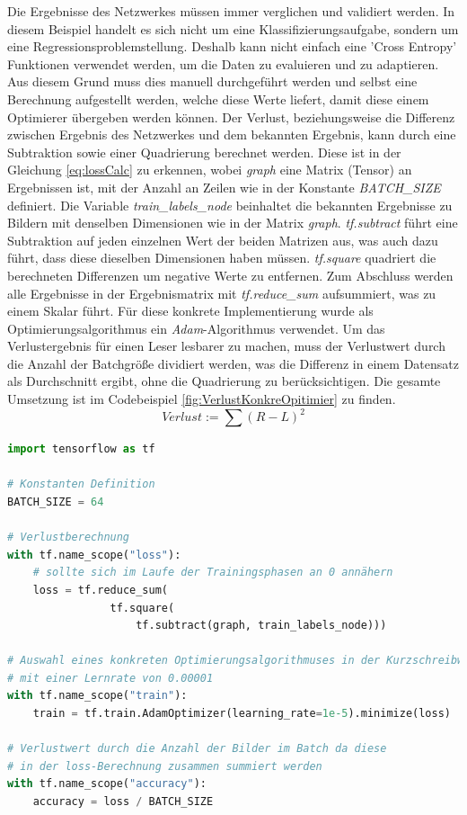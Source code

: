 Die Ergebnisse des Netzwerkes müssen immer verglichen und validiert werden. 
In diesem Beispiel handelt es sich nicht um eine Klassifizierungsaufgabe, sondern um eine Regressionsproblemstellung. 
Deshalb kann nicht einfach eine 'Cross Entropy' Funktionen verwendet werden, um die Daten zu evaluieren und zu adaptieren. 
Aus diesem Grund muss dies manuell durchgeführt werden und selbst eine Berechnung aufgestellt werden, welche diese Werte liefert, damit diese einem Optimierer übergeben werden können. 
Der Verlust, beziehungsweise die Differenz zwischen Ergebnis des Netzwerkes und dem bekannten Ergebnis, kann durch eine Subtraktion sowie einer Quadrierung berechnet werden. 
Diese ist in der Gleichung \ref{eq:lossCalc} zu erkennen, wobei \textit{graph} eine Matrix (Tensor) an Ergebnissen ist, mit der Anzahl an Zeilen wie in der Konstante \textit{BATCH\_SIZE} definiert. 
Die Variable \textit{train\_labels\_node} beinhaltet die bekannten Ergebnisse zu Bildern mit denselben Dimensionen wie in der Matrix \textit{graph}. 
\textit{tf.subtract} führt eine Subtraktion auf jeden einzelnen Wert der beiden Matrizen aus, was auch dazu führt, dass diese dieselben Dimensionen haben müssen. 
\textit{tf.square} quadriert die berechneten Differenzen um negative Werte zu entfernen. 
Zum Abschluss werden alle Ergebnisse in der Ergebnismatrix mit \textit{tf.reduce\_sum} aufsummiert, was zu einem Skalar führt. 
Für diese konkrete Implementierung wurde als Optimierungsalgorithmus ein \textit{Adam}-Algorithmus \cite{DBLP:journals/corr/KingmaB14} verwendet. 
Um das Verlustergebnis für einen Leser lesbarer zu machen, muss der Verlustwert durch die Anzahl der Batchgröße dividiert werden, was die Differenz in einem Datensatz als Durchschnitt ergibt, ohne die Quadrierung zu berücksichtigen. 
Die gesamte Umsetzung ist im Codebeispiel \ref{fig:VerlustKonkreOpitimier} zu finden. 
\begin{equation}
	Verlust := \sum{(R - L)^2}
	\label{eq:lossCalc}
\end{equation}
\begin{lstlisting}[caption={Verlustberechnung, konkreter Opitimierungsalgorithmus, Genauigkeitsberechnung},label=fig:VerlustKonkreOpitimier,captionpos=b,language=Python]
import tensorflow as tf

# Konstanten Definition
BATCH_SIZE = 64

# Verlustberechnung
with tf.name_scope("loss"):
    # sollte sich im Laufe der Trainingsphasen an 0 annähern
    loss = tf.reduce_sum(
    			tf.square(
    				tf.subtract(graph, train_labels_node)))

# Auswahl eines konkreten Optimierungsalgorithmuses in der Kurzschreibweise
# mit einer Lernrate von 0.00001
with tf.name_scope("train"):
    train = tf.train.AdamOptimizer(learning_rate=1e-5).minimize(loss)
    
# Verlustwert durch die Anzahl der Bilder im Batch da diese 
# in der loss-Berechnung zusammen summiert werden
with tf.name_scope("accuracy"):    
    accuracy = loss / BATCH_SIZE
\end{lstlisting}
 
